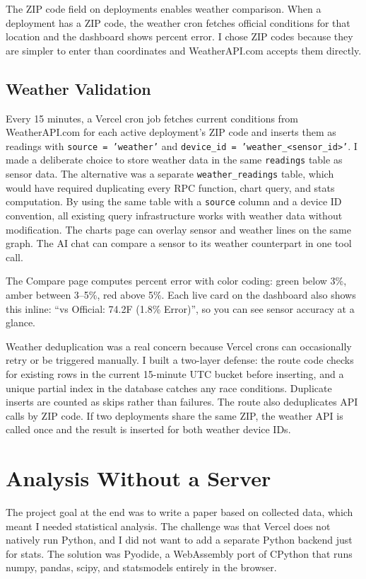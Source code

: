 \documentclass[11pt, letterpaper]{article}
\begin{document}
The ZIP code field on deployments enables weather comparison. When a deployment has a ZIP code, the weather cron fetches official conditions for that location and the dashboard shows percent error. I chose ZIP codes because they are simpler to enter than coordinates and WeatherAPI.com accepts them directly.

\subsection{Weather Validation}

Every 15 minutes, a Vercel cron job fetches current conditions from WeatherAPI.com for each active deployment's ZIP code and inserts them as readings with \texttt{source = 'weather'} and \texttt{device\_id = 'weather\_<sensor\_id>'}. I made a deliberate choice to store weather data in the same \texttt{readings} table as sensor data. The alternative was a separate \texttt{weather\_readings} table, which would have required duplicating every RPC function, chart query, and stats computation. By using the same table with a \texttt{source} column and a device ID convention, all existing query infrastructure works with weather data without modification. The charts page can overlay sensor and weather lines on the same graph. The AI chat can compare a sensor to its weather counterpart in one tool call.

The Compare page computes percent error with color coding: green below 3\%, amber between 3--5\%, red above 5\%. Each live card on the dashboard also shows this inline: ``vs Official: 74.2\textdegree F (1.8\% Error)'', so you can see sensor accuracy at a glance.

Weather deduplication was a real concern because Vercel crons can occasionally retry or be triggered manually. I built a two-layer defense: the route code checks for existing rows in the current 15-minute UTC bucket before inserting, and a unique partial index in the database catches any race conditions. Duplicate inserts are counted as skips rather than failures. The route also deduplicates API calls by ZIP code. If two deployments share the same ZIP, the weather API is called once and the result is inserted for both weather device IDs.


\section{Analysis Without a Server}

The project goal at the end was to write a paper based on collected data, which meant I needed statistical analysis. The challenge was that Vercel does not natively run Python, and I did not want to add a separate Python backend just for stats. The solution was Pyodide, a WebAssembly port of CPython that runs numpy, pandas, scipy, and statsmodels entirely in the browser.
\end{document}
